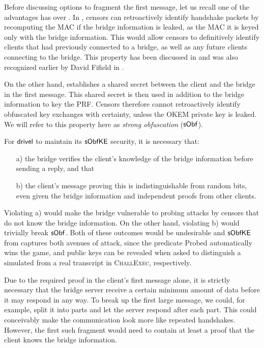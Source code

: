 Before discussing options to fragment the first message, let us recall one of the advantages \drivel{} has over \obfsfour{}. In \obfsfour{}, censors can retroactively identify handshake packets by recomputing the MAC if the bridge information is leaked, as the MAC it is keyed only with the bridge information. This would allow censors to definitively identify clients that had previously connected to a bridge, as well as any future clients connecting to the bridge. This property has been discussed in \cite[Section~6]{CCS:GunSteVei24} and was also recognized earlier by David Fifield in \cite{obfs4-pk-reveal-distinguisher}.

On the other hand, \drivel{} establishes a shared secret between the client and the bridge in the first message. This shared secret is then used in addition to the bridge information to key the PRF. Censors therefore cannot retroactively identify obfuscated key exchanges with certainty, unless the OKEM private key is leaked. We will refer to this property here as \emph{strong obfuscation} ($\mathsf{sObf}$).

For $\textsf{drivel}$ to maintain its $\mathsf{sObfKE}$ security, it is necessary that:
\begin{itemize}
    \item[a)] the bridge verifies the client's knowledge of the bridge information before sending a reply, and that
    \item[b)] the client's message proving this is indistinguishable from random bits, even given the bridge information and independent proofs from other clients.
\end{itemize}

Violating a) would make the bridge vulnerable to probing attacks by censors that do not know the bridge information. On the other hand, violating b) would trivially break $\mathsf{sObf}$. Both of these outcomes would be undesirable and $\mathsf{sObfKE}$ from \cite{CCS:GunSteVei24} captures both avenues of attack, since the predicate \textsf{Probed} automatically wins the game, and public keys can be revealed when asked to distinguish a simulated from a real transcript in \textsc{ChallExec}, respectively.

Due to the required proof in the client's first message alone, it is strictly necessary that the bridge server receive a certain minimum amount of data before it may respond in any way.
To break up the first large \drivel{} message, we could, for example, split it into parts and let the server respond after each part. This could conceivably make the communication look more like repeated \obfsfour{} handshakes. However, the first such fragment would need to contain at least a proof that the client knows the bridge information.

